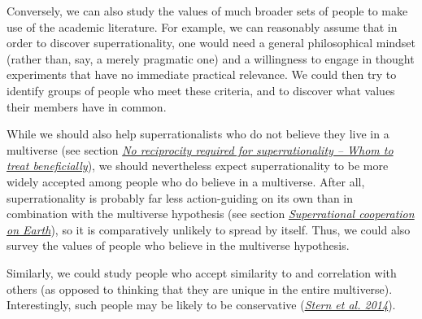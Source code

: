 Conversely, we can also study the values of much broader sets of people
to make use of the academic literature. For example, we can reasonably
assume that in order to discover superrationality, one would need a
general philosophical mindset (rather than, say, a merely pragmatic one)
and a willingness to engage in thought experiments that have no
immediate practical relevance. We could then try to identify groups of
people who meet these criteria, and to discover what values their
members have in common.

While we should also help superrationalists who do not believe they live
in a multiverse (see section
\protect\hyperlink{no-reciprocity-needed-whom-to-treat-beneficially}{\emph{No
reciprocity required for superrationality -- Whom to treat
beneficially}}), we should nevertheless expect superrationality to be
more widely accepted among people who do believe in a multiverse. After
all, superrationality is probably far less action-guiding on its own
than in combination with the multiverse hypothesis (see section
\protect\hyperlink{superrational-cooperation-on-earth}{\emph{Superrational
cooperation on Earth}}), so it is comparatively unlikely to spread by
itself. Thus, we could also survey the values of people who believe in
the multiverse hypothesis.

Similarly, we could study people who accept similarity to and
correlation with others (as opposed to thinking that they are unique in
the entire multiverse). Interestingly, such people may be likely to be
conservative
(\href{http://journals.sagepub.com/doi/pdf/10.1177/0956797613500796}{\emph{Stern
et al. 2014}}).

